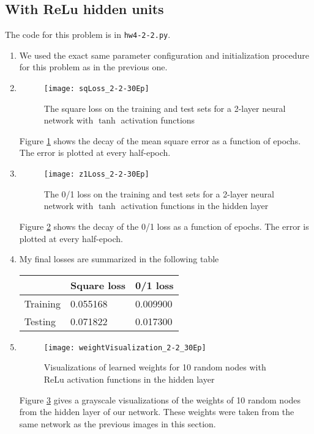\documentclass{article}
\begin{document}
\subsection{With ReLu hidden units}
The code for this problem is in \texttt{hw4-2-2.py}.
\begin{enumerate}
    \item We used the exact same parameter configuration and initialization procedure for this problem as in the previous one.
    \item
    \begin{figure}
        \centering
        \texttt{[image: sqLoss\_2-2-30Ep]}
        \caption{The square loss on the training and test sets for a 2-layer neural network with $\tanh$ activation functions} 
        \label{fig:sqLoss_2-2}
    \end{figure}
    Figure \ref{fig:sqLoss_2-2} shows the decay of the mean square error as a function of epochs. The error is plotted at every half-epoch.
    \item
    \begin{figure}
        \centering
        \texttt{[image: z1Loss\_2-2-30Ep]}
        \caption{The 0/1 loss on the training and test sets for a 2-layer neural network with $\tanh$ activation functions in the hidden layer} 
        \label{fig:z1Loss_2-2}
    \end{figure}
    Figure \ref{fig:z1Loss_2-2} shows the decay of the 0/1 loss as a function of epochs. The error is plotted at every half-epoch.
    \item My final losses are summarized in the following table

    \begin{tabular}{l|ll}
    & Square loss & 0/1 loss \\
    \hline
    Training & 0.055168  & 0.009900 \\
    Testing  & 0.071822  & 0.017300
    \end{tabular}

    \item 
    \begin{figure}
        \centering
        \texttt{[image: weightVisualization\_2-2\_30Ep]}
        \caption{Visualizations of learned weights for 10 random nodes with ReLu activation functions in the hidden layer} 
        \label{fig:weights2-2}
    \end{figure}
    Figure \ref{fig:weights2-2} gives a grayscale visualizations of the weights of 10 random nodes from the hidden layer of our network. These weights were taken from the same network as the previous images in this section.
\end{enumerate}
\end{document}

